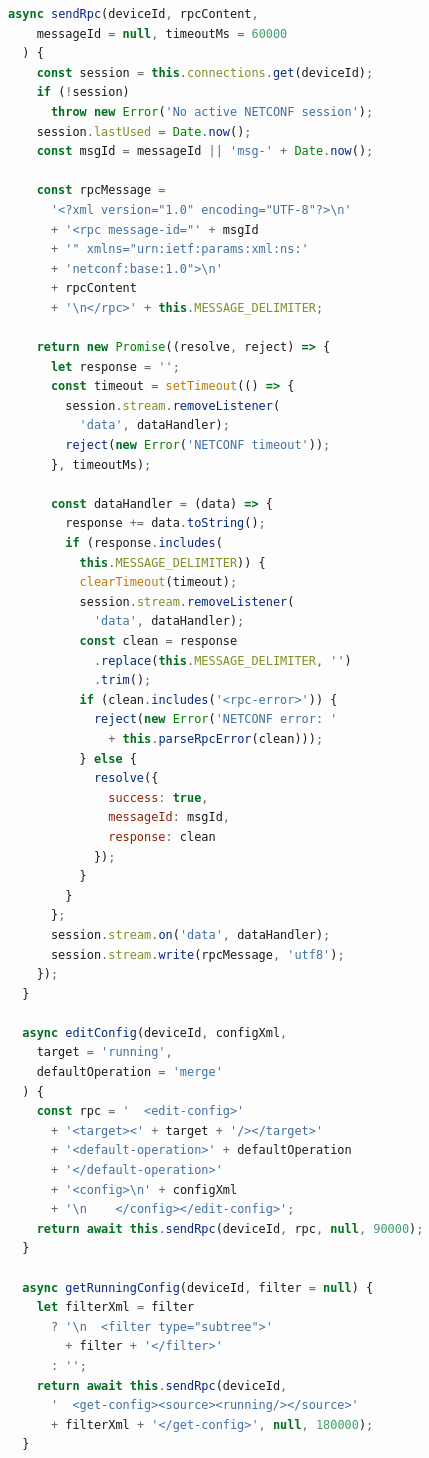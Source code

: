 \begin{lstlisting}[language=JavaScript, caption={netconfService.js -- sendRpc และ editConfig}]
  async sendRpc(deviceId, rpcContent,
    messageId = null, timeoutMs = 60000
  ) {
    const session = this.connections.get(deviceId);
    if (!session)
      throw new Error('No active NETCONF session');
    session.lastUsed = Date.now();
    const msgId = messageId || 'msg-' + Date.now();

    const rpcMessage =
      '<?xml version="1.0" encoding="UTF-8"?>\n'
      + '<rpc message-id="' + msgId
      + '" xmlns="urn:ietf:params:xml:ns:'
      + 'netconf:base:1.0">\n'
      + rpcContent
      + '\n</rpc>' + this.MESSAGE_DELIMITER;

    return new Promise((resolve, reject) => {
      let response = '';
      const timeout = setTimeout(() => {
        session.stream.removeListener(
          'data', dataHandler);
        reject(new Error('NETCONF timeout'));
      }, timeoutMs);

      const dataHandler = (data) => {
        response += data.toString();
        if (response.includes(
          this.MESSAGE_DELIMITER)) {
          clearTimeout(timeout);
          session.stream.removeListener(
            'data', dataHandler);
          const clean = response
            .replace(this.MESSAGE_DELIMITER, '')
            .trim();
          if (clean.includes('<rpc-error>')) {
            reject(new Error('NETCONF error: '
              + this.parseRpcError(clean)));
          } else {
            resolve({
              success: true,
              messageId: msgId,
              response: clean
            });
          }
        }
      };
      session.stream.on('data', dataHandler);
      session.stream.write(rpcMessage, 'utf8');
    });
  }

  async editConfig(deviceId, configXml,
    target = 'running',
    defaultOperation = 'merge'
  ) {
    const rpc = '  <edit-config>'
      + '<target><' + target + '/></target>'
      + '<default-operation>' + defaultOperation
      + '</default-operation>'
      + '<config>\n' + configXml
      + '\n    </config></edit-config>';
    return await this.sendRpc(deviceId, rpc, null, 90000);
  }

  async getRunningConfig(deviceId, filter = null) {
    let filterXml = filter
      ? '\n  <filter type="subtree">'
        + filter + '</filter>'
      : '';
    return await this.sendRpc(deviceId,
      '  <get-config><source><running/></source>'
      + filterXml + '</get-config>', null, 180000);
  }
\end{lstlisting}

